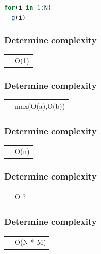 \documentclass{beamer}
\begin{document}
\newsavebox{\listboxV}

\begin{lrbox}{\listboxV}	
	\begin{lstlisting}[language=R,basicstyle=\ttfamily,keywordstyle=\color{black}]
for(i in 1:N)
  g(i)
\end{lstlisting}
\end{lrbox}

\begin{frame}
	\frametitle{Determine complexity}
	\begin{centering}
		\begin{tabular}{p{4.5cm} p{4.5cm}}
			\usebox{\listboxI} & O(1) \\
		\end{tabular}
	\end{centering} 
\end{frame}

\begin{frame}
	\frametitle{Determine complexity}
	\begin{centering}
	\begin{tabular}{p{4.5cm} p{4.5cm}}
		\usebox{\listboxII} & max(O(a),O(b)) \\
	\end{tabular} 
	\end{centering} 
\end{frame}


\begin{frame}
	\frametitle{Determine complexity}
	\begin{centering}
	\begin{tabular}{p{4.5cm} p{4.5cm}}
		\usebox{\listboxIII} & O(n) \\
	\end{tabular} 
	\end{centering} 
\end{frame}

\begin{frame}
	\frametitle{Determine complexity}
	\begin{centering}
		\begin{tabular}{p{4.5cm} p{4.5cm}}
			\usebox{\listboxIV} & O ? \\
		\end{tabular} 
	\end{centering} 
\end{frame}

\begin{frame}
	\frametitle{Determine complexity}
	\begin{centering}
		\begin{tabular}{p{4.5cm} p{4.5cm}}
			\usebox{\listboxIV} & O(N * M) \\
		\end{tabular} 
	\end{centering} 
\end{frame}
\end{document}

